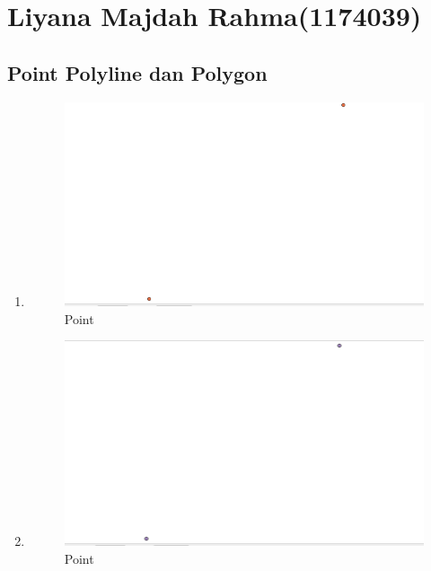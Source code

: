 \section{Liyana Majdah Rahma(1174039)}
\subsection{Point Polyline dan Polygon}
\begin{enumerate}
	\item 
	
	\begin{figure}[H]
		\includegraphics[width=12cm]{figures/1174039/gambar/hasil1.PNG}
		\centering
		\caption{Point}
	\end{figure}
	
	\item 
	
	\begin{figure}[H]
		\includegraphics[width=12cm]{figures/1174039/gambar/hasil2.PNG}
		\centering
		\caption{Point}
	\end{figure}
	

\end{enumerate}
